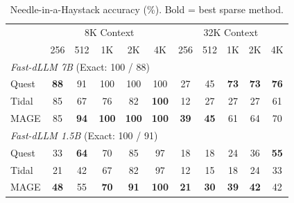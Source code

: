 \begin{table}[t]
\centering
\footnotesize
\setlength{\tabcolsep}{2.5pt}
\caption{Needle-in-a-Haystack accuracy (\%). Bold = best sparse method.}
\label{tab:niah}
\begin{tabular}{l|ccccc|ccccc}
\toprule
 & \multicolumn{5}{c|}{8K Context} & \multicolumn{5}{c}{32K Context} \\
 & 256 & 512 & 1K & 2K & 4K & 256 & 512 & 1K & 2K & 4K \\
\midrule
\multicolumn{11}{l}{\textit{Fast-dLLM 7B} (Exact: 100 / 88)} \\
Quest & \textbf{88} & 91 & 100 & 100 & 100 & 27 & 45 & \textbf{73} & \textbf{73} & \textbf{76} \\
Tidal & 85 & 67 & 76 & 82 & \textbf{100} & 12 & 27 & 27 & 27 & 61 \\
MAGE & 85 & \textbf{94} & \textbf{100} & \textbf{100} & \textbf{100} & \textbf{39} & \textbf{45} & 61 & 64 & 70 \\
\midrule
\multicolumn{11}{l}{\textit{Fast-dLLM 1.5B} (Exact: 100 / 91)} \\
Quest & 33 & \textbf{64} & 70 & 85 & 97 & 18 & 18 & 24 & 36 & \textbf{55} \\
Tidal & 21 & 42 & 67 & 82 & 97 & 12 & 15 & 18 & 24 & 33 \\
MAGE & \textbf{48} & 55 & \textbf{70} & \textbf{91} & \textbf{100} & \textbf{21} & \textbf{30} & \textbf{39} & \textbf{42} & 42 \\
\bottomrule
\end{tabular}
\end{table}
